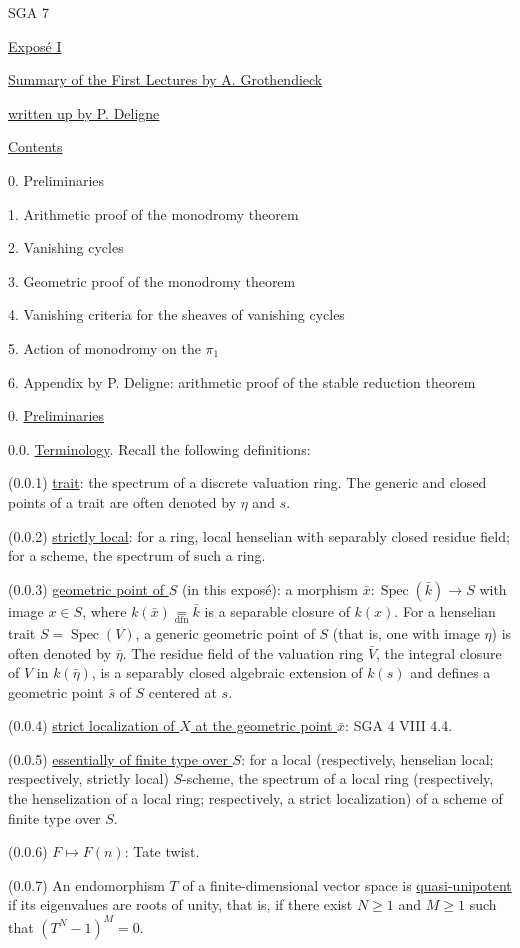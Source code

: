 

SGA 7

\underline{Expos\'e I}

\underline{Summary of the First Lectures by A. Grothendieck}

\underline{written up by P. Deligne}

\underline{Contents}

0. Preliminaries

1. Arithmetic proof of the monodromy theorem

2. Vanishing cycles

3. Geometric proof of the monodromy theorem

4. Vanishing criteria for the sheaves of vanishing cycles

5. Action of monodromy on the $\pi_1$

6. Appendix by P. Deligne: arithmetic proof of the stable reduction theorem

0. \underline{Preliminaries}

0.0. \underline{Terminology}. Recall the following definitions:

(0.0.1) \underline{trait}: the spectrum of a discrete valuation ring. The generic and closed points of a trait are often denoted by $\eta$ and $s$.

(0.0.2) \underline{strictly local}: for a ring, local henselian with separably closed residue field; for a scheme, the spectrum of such a ring.

(0.0.3) \underline{geometric point of $S$} (in this expos\'e): a morphism $\bar{x}:\operatorname{Spec}(\bar{k})\longrightarrow S$ with image $x\in S$, where $k(\bar{x})\underset{\mathrm{dfn}}{=}\bar{k}$ is a separable closure of $k(x)$. For a henselian trait $S=\operatorname{Spec}(V)$, a generic geometric point of $S$ (that is, one with image $\eta$) is often denoted by $\bar{\eta}$. The residue field of the valuation ring $\bar{V}$, the integral closure of $V$ in $k(\bar{\eta})$, is a separably closed algebraic extension of $k(s)$ and defines a geometric point $\bar{s}$ of $S$ centered at $s$.


(0.0.4) \underline{strict localization of $X$ at the geometric point $\bar{x}$}: SGA 4 VIII 4.4.

(0.0.5) \underline{essentially of finite type over $S$}: for a local (respectively, henselian local; respectively, strictly local) $S$-scheme, the spectrum of a local ring (respectively, the henselization of a local ring; respectively, a strict localization) of a scheme of finite type over $S$.

(0.0.6) $F\longmapsto F(n)$: Tate twist.

(0.0.7) An endomorphism $T$ of a finite-dimensional vector space is \underline{quasi-unipotent} if its eigenvalues are roots of unity, that is, if there exist $N\geqslant 1$ and $M\geqslant 1$ such that $(T^N-1)^M=0$.
